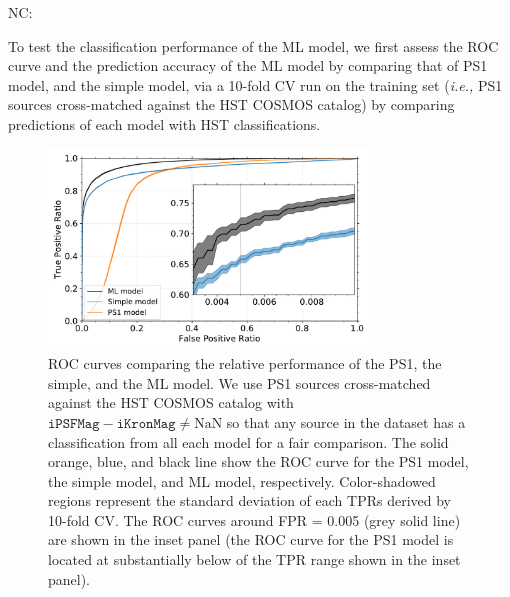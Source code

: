\documentclass[twocolumn]{aastex62}
\newcommand{\NC}[1]{{\color{brown} NC: {#1}}}
\begin{document}
\NC{To test the classification performance of the ML model, 
we first assess the ROC curve and the prediction accuracy 
of the ML model by comparing that of PS1 model, and the simple model, 
via a 10-fold CV run on the training set ({\it i.e.,} PS1 sources cross-matched against the HST COSMOS catalog) 
by comparing predictions of each model with HST classifications. 
\begin{figure}[t]
 \centering
  \includegraphics[width=3.35in, bb = 0 0 576 360]{./Figures/CV_ROC_HST.pdf}
  \caption{
  ROC curves comparing the relative performance of the PS1, the simple, and the ML model. 
  We use PS1 sources cross-matched against the HST COSMOS catalog with 
  $\mathtt{iPSFMag} - \mathtt{iKronMag} \neq \mathrm{NaN}$ 
  so that any source in the dataset has a classification from all each model 
  for a fair comparison. 
  The solid orange, blue, and black line show the ROC curve 
  for the PS1 model, the simple model, and ML model, respectively. 
  Color-shadowed regions represent the standard deviation of each TPRs derived by 10-fold CV. 
  The ROC curves around FPR = 0.005 (grey solid line) are shown in the inset panel 
  (the ROC curve for the PS1 model is located at substantially below of the TPR range shown in the inset panel). 
  }
  \label{fig:cvroc_hst}
\end{figure}

}
\end{document}
